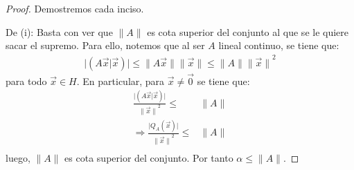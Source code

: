 \documentclass[12pt]{report}
\newcounter{it}
\theoremstyle{largebreak}
\newcommand\abs[1]{\ensuremath{\big|#1\big|}}
\newcommand\pint[2]{\ensuremath{\left(#1\big|#2\right)}}
\newcommand\norm[1]{\ensuremath{\|#1\|}}
\begin{document}
    \begin{proof}
        Demostremos cada inciso.

        De (i): Basta con ver que $\norm{A}$ es cota superior del conjunto al que se le quiere sacar el supremo. Para ello, notemos que al ser $A$ lineal continuo, se tiene que:
        \begin{equation*}
            \begin{split}
                \abs{\pint{A\vec{x}}{\vec{x}}} \leq \norm{A\vec{x}}\norm{\vec{x}}\leq\norm{A}\norm{\vec{x}}^2
            \end{split}
        \end{equation*}
        para todo $\vec{x}\in H$. En particular, para $\vec{x}\neq\vec{0}$ se tiene que:
        \begin{equation*}
            \begin{split}
                \frac{\abs{\pint{A\vec{x}}{\vec{x}}}}{\norm{\vec{x}}^2}\leq&\norm{A}\\
                \Rightarrow \frac{\abs{Q_A(\vec{x})}}{\norm{\vec{x}}^2}\leq&\norm{A}\\
            \end{split}
        \end{equation*}
        luego, $\norm{A}$ es cota superior del conjunto. Por tanto $\alpha\leq\norm{A}$.


\end{proof}
\end{document}
